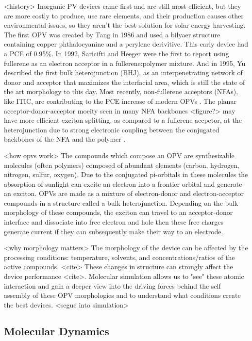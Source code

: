 <history>
Inorganic PV devices came first and are still most efficient, but they are more costly to produce, use rare elements, and their production causes other environmental issues, so they aren't the best solution for solar energy harvesting. 
The first OPV was created by Tang in 1986 and \cite{Tang1986b} used a bilyaer structure containing copper phthalocyanine and a perylene derivitive. 
This early device had a PCE of 0.95\%.
In 1992, Saricifti and Heeger\cite{Saricifti1992} were the first to report using fullerene as an electron acceptor in a fullerene:polymer mixture.
And in 1995, Yu described the first bulk heterojunction (BHJ), as an interpenetrating network of donor and acceptor that maximizes the interfacial area, which is still the state of the art morphology to this day\cite{Yu1995}.
Most recently, non-fullerene acceptors (NFAs), like ITIC, are contributing to the PCE increase of modern OPVs \cite{S.Gurney2019}.
The planar acceptor-donor-acceptor moeity seen in many NFA backbones <figure?> may have more efficient exciton splitting, as compared to a fullerene accpetor, at the heterojunction due to strong electronic coupling between the conjugated backbones of the NFA and the polymer \cite{Yi2018}.

<how opvs work>
The compounds which compose an OPV are synthesizable molecules (often polymers) composed of abundant elements (carbon, hydrogen, nitrogen, sulfur, oxygen).
Due to the conjugated pi-orbitals in these molecules the absorption of sunlight can excite an electron into a frontier orbital and generate an exciton.
OPVs are made as a mixture of electron-donor and electron-acceptor compounds in a structure called a bulk-heterojunction.
Depending on the bulk morphology of these compounds, the exciton can travel to an acceptor-donor interface and dissociate into free electron and hole then these free charges generate current if they can subsequently make their way to an electrode.

<why morphology matters>
The morphology of the device can be affected by the processing conditions: temperature, solvents, and concentrations/ratios of the active compounds. <cite>
These changes in structure can strongly affect the device performance <cite>.
Molecular simulation allows us to "see" these atomic interaction and gain a deeper view into the driving forces behind the self assembly of these OPV morphologies and to understand what conditions create the best devices.
<segue into simulation>

\subsection*{Molecular Dynamics}

